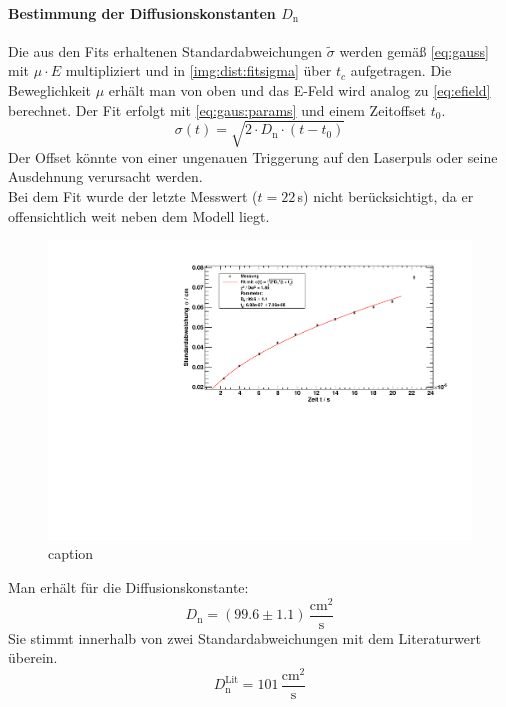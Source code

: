 \paragraph{Bestimmung der Diffusionskonstanten $D_\text{n}$}
Die aus den Fits erhaltenen Standardabweichungen $\tilde{\sigma}$ werden gemäß \autoref{eq:gauss} mit $\mu \cdot E$ multipliziert und 
in \autoref{img:dist:fitsigma} über $t_c$ aufgetragen. Die Beweglichkeit $\mu$ erhält man von oben und das E-Feld wird analog zu \autoref{eq:efield} berechnet.
Der Fit erfolgt mit \autoref{eq:gaus:params} und einem Zeitoffset $t_0$.
\begin{equation}
  \sigma(t) = \sqrt{2 \cdot D_\text{n} \cdot (t-t_0)}
\end{equation}
Der Offset könnte von einer ungenauen Triggerung auf den Laserpuls oder seine Ausdehnung verursacht werden. \\
Bei dem Fit wurde der letzte Messwert ($t=22$\,\textmu s) nicht berücksichtigt, da er offensichtlich weit neben dem Modell liegt.

\begin{figure}[H]
\begin{center}
  \includegraphics[width=\textwidth]{../img/part2/dist_fitSigma.pdf}
  \caption{caption}
  \label{img:dist:fitsigma}
\end{center}
\end{figure}
Man erhält für die Diffusionskonstante:
\begin{equation}
  D_\text{n} = (99.6 \pm 1.1)\,\frac{\text{cm}^2}{\text{s}}
\end{equation}
Sie stimmt innerhalb von zwei Standardabweichungen mit dem Literaturwert überein. 
\begin{equation}
  D_\text{n}^{\text{Lit}} = 101\,\frac{\text{cm}^2}{\text{s}} 
\end{equation}

